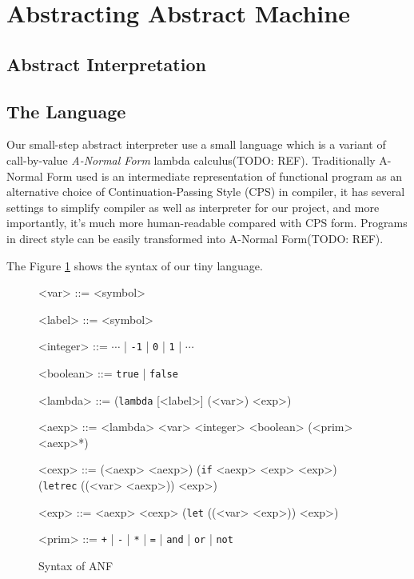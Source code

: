 \documentclass[paper=a4, fontsize=11pt]{scrartcl} %
\numberwithin{equation}{section} %
\numberwithin{figure}{section} %
\numberwithin{table}{section} %
\begin{document}

\section{Abstracting Abstract Machine}


\subsection{Abstract Interpretation}


\subsection{The Language}

Our small-step abstract interpreter use a small language which is a variant of call-by-value \textit{A-Normal Form} lambda calculus(TODO: REF). Traditionally A-Normal Form used is an intermediate representation of functional program as an alternative choice of Continuation-Passing Style (CPS) in compiler, it has several settings to simplify compiler as well as interpreter for our project, and more importantly, it's much more human-readable compared with CPS form. Programs in direct style can be easily transformed into A-Normal Form(TODO: REF).

The Figure \ref{fig2} shows the syntax of our tiny language.

\begin{figure}[h!]
\setlength{\grammarparsep}{7pt plus 1pt minus 1pt} %
\setlength{\grammarindent}{8em} %
\begin{grammar}
<var> ::= <symbol>

<label> ::= <symbol>

<integer> ::= $\cdots$ | \texttt{-1} | \texttt{0} | \texttt{1} | $\cdots$

<boolean> ::= \texttt{true} | \texttt{false}

<lambda> ::= (\texttt{lambda} [<label>] (<var>) <exp>)

<aexp> ::= <lambda>
\alt <var>
\alt <integer>
\alt <boolean>
\alt (<prim> <aexp>*)

<cexp> ::= (<aexp> <aexp>)
\alt (\texttt{if} <aexp> <exp> <exp>)
\alt (\texttt{letrec} ((<var> <aexp>)) <exp>)

<exp> ::= <aexp>
\alt <cexp>
\alt (\texttt{let} ((<var> <exp>)) <exp>)

<prim> ::= \texttt{+} | \texttt{-} | \texttt{*} | \texttt{=} | \texttt{and} | \texttt{or} | \texttt{not}
\end{grammar}
\caption{Syntax of ANF}
\label{fig2}
\end{figure}
\end{document}
